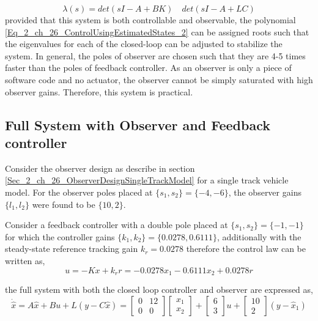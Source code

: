 \begin{equation}\label{Eq_2_ch_26_ControlUsingEstimatedStates_2}
	\lambda(s) = det(sI - A + BK) \quad det(sI - A +LC)
\end{equation}
provided that this system is both controllable and observable, the polynomial \eqref{Eq_2_ch_26_ControlUsingEstimatedStates_2} can be assigned roots such that the eigenvalues for each of the closed-loop can be adjusted to stabilize the system. In general, the poles of observer are chosen such that they are 4-5 times faster than the poles of feedback controller. As an observer is only a piece of software code and no actuator, the observer cannot be simply saturated with high observer gains. Therefore, this system is practical.

\subsection{Full System with Observer and Feedback controller}

Consider the observer design as describe in section \ref{Sec_2_ch_26_ObserverDesignSingleTrackModel} for a single track vehicle model. For the observer poles placed at $\{s_1, s_2\} = \{-4,-6\}$, the observer gains $\{l_1,l_2\}$ were found to be $\{10,2\}$.

Consider a feedback controller with a double pole placed at $\{s_1,s_2\} = \{-1,-1\}$ for which the controller gains $\{k_1,k_2\} = \{0.0278,0.6111\}$, additionally with the steady-state reference tracking gain $k_r = 0.0278$ therefore the control law can be written as,
\begin{equation}
	u = -Kx + k_r r = -0.0278 x_1 - 0.6111 x_2 + 0.0278 r
\end{equation}

the full system with both the closed loop controller and observer are expressed as,
\begin{equation}
	\dot{\hat{x}} = A \hat{x} + Bu + L(y - C\hat{x}) = \begin{bmatrix}
	0 & 12 \\ 0 & 0
	\end{bmatrix}\begin{bmatrix}
	{x}_{1} \\ {x}_{2}
	\end{bmatrix} + \begin{bmatrix}
	6 \\ 3
	\end{bmatrix}u + \begin{bmatrix}
	10 \\ 2
	\end{bmatrix}(y - \hat{x}_{1})
\end{equation}

